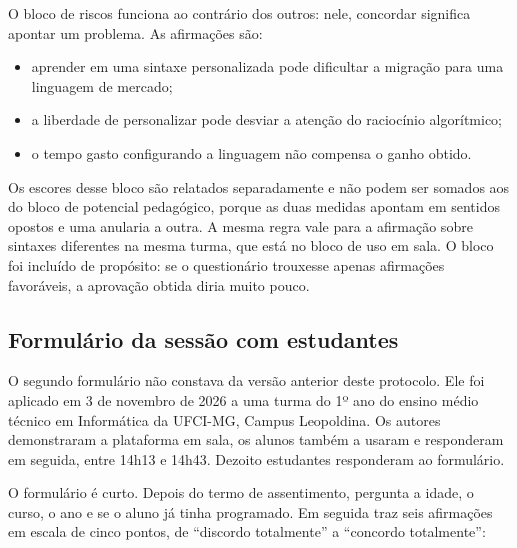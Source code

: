 O bloco de riscos funciona ao contrário dos outros: nele, concordar significa apontar um problema. As afirmações são:

\begin{itemize}
    \item aprender em uma sintaxe personalizada pode dificultar a migração para uma linguagem de mercado;
    \item a liberdade de personalizar pode desviar a atenção do raciocínio algorítmico;
    \item o tempo gasto configurando a linguagem não compensa o ganho obtido.
\end{itemize}
 Os escores desse bloco são relatados separadamente e não podem ser somados aos do bloco de potencial pedagógico, porque as duas medidas apontam em sentidos opostos e uma anularia a outra. A mesma regra vale para a afirmação sobre sintaxes diferentes na mesma turma, que está no bloco de uso em sala. O bloco foi incluído de propósito: se o questionário trouxesse apenas afirmações favoráveis, a aprovação obtida diria muito pouco.

\subsection{Formulário da sessão com estudantes}
\label{subsec:formulario-estudantes}

O segundo formulário não constava da versão anterior deste protocolo. Ele foi aplicado em 3 de novembro de 2026 a uma turma do 1º ano do ensino médio técnico em Informática da UFCI-MG, Campus Leopoldina. Os autores demonstraram a plataforma em sala, os alunos também a usaram e responderam em seguida, entre 14h13 e 14h43. Dezoito estudantes responderam ao formulário.

O formulário é curto. Depois do termo de assentimento, pergunta a idade, o curso, o ano e se o aluno já tinha programado. Em seguida traz seis afirmações em escala de cinco pontos, de ``discordo totalmente'' a ``concordo totalmente'':

